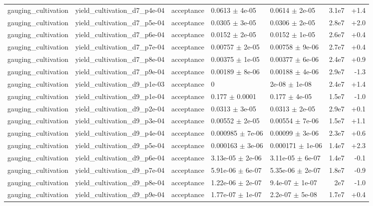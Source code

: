 \documentclass[10pt]{article}
\begin{document}
{\begin{longtable}{l l l l l r r}
gauging\_cultivation & yield\_cultivation\_d7\_p4e-04 & acceptance & 0.0613 $\pm$ 4e-05 & 0.0614 $\pm$ 2e-05 & 3.1e7 & +1.4 \\
gauging\_cultivation & yield\_cultivation\_d7\_p5e-04 & acceptance & 0.0305 $\pm$ 3e-05 & 0.0306 $\pm$ 2e-05 & 2.8e7 & +2.0 \\
gauging\_cultivation & yield\_cultivation\_d7\_p6e-04 & acceptance & 0.0152 $\pm$ 2e-05 & 0.0152 $\pm$ 1e-05 & 2.6e7 & +0.4 \\
gauging\_cultivation & yield\_cultivation\_d7\_p7e-04 & acceptance & 0.00757 $\pm$ 2e-05 & 0.00758 $\pm$ 9e-06 & 2.7e7 & +0.4 \\
gauging\_cultivation & yield\_cultivation\_d7\_p8e-04 & acceptance & 0.00375 $\pm$ 1e-05 & 0.00377 $\pm$ 6e-06 & 2.4e7 & +0.9 \\
gauging\_cultivation & yield\_cultivation\_d7\_p9e-04 & acceptance & 0.00189 $\pm$ 8e-06 & 0.00188 $\pm$ 4e-06 & 2.9e7 & -1.3 \\
gauging\_cultivation & yield\_cultivation\_d9\_p1e-03 & acceptance & 0 & 2e-08 $\pm$ 1e-08 & 2.4e7 & +1.4 \\
gauging\_cultivation & yield\_cultivation\_d9\_p1e-04 & acceptance & 0.177 $\pm$ 0.0001 & 0.177 $\pm$ 4e-05 & 1.5e7 & -1.0 \\
gauging\_cultivation & yield\_cultivation\_d9\_p2e-04 & acceptance & 0.0313 $\pm$ 3e-05 & 0.0313 $\pm$ 2e-05 & 2.9e7 & +0.1 \\
gauging\_cultivation & yield\_cultivation\_d9\_p3e-04 & acceptance & 0.00552 $\pm$ 2e-05 & 0.00554 $\pm$ 7e-06 & 1.5e7 & +1.1 \\
gauging\_cultivation & yield\_cultivation\_d9\_p4e-04 & acceptance & 0.000985 $\pm$ 7e-06 & 0.00099 $\pm$ 3e-06 & 2.3e7 & +0.6 \\
gauging\_cultivation & yield\_cultivation\_d9\_p5e-04 & acceptance & 0.000163 $\pm$ 3e-06 & 0.000171 $\pm$ 1e-06 & 1.4e7 & +2.3 \\
gauging\_cultivation & yield\_cultivation\_d9\_p6e-04 & acceptance & 3.13e-05 $\pm$ 2e-06 & 3.11e-05 $\pm$ 6e-07 & 1.4e7 & -0.1 \\
gauging\_cultivation & yield\_cultivation\_d9\_p7e-04 & acceptance & 5.91e-06 $\pm$ 6e-07 & 5.35e-06 $\pm$ 2e-07 & 1.8e7 & -0.9 \\
gauging\_cultivation & yield\_cultivation\_d9\_p8e-04 & acceptance & 1.22e-06 $\pm$ 2e-07 & 9.4e-07 $\pm$ 1e-07 & 2e7 & -1.0 \\
gauging\_cultivation & yield\_cultivation\_d9\_p9e-04 & acceptance & 1.77e-07 $\pm$ 1e-07 & 2.2e-07 $\pm$ 5e-08 & 1.7e7 & +0.4 \\

\end{longtable}}
\end{document}
